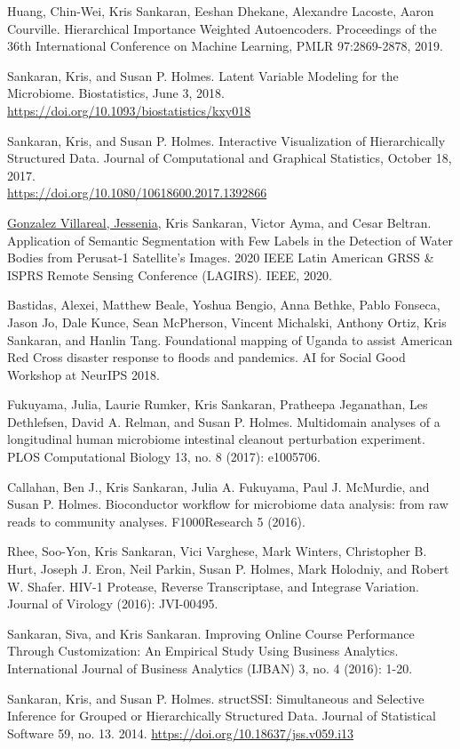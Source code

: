 \documentclass[letterpaper]{article}
\renewenvironment{itemize}{
  \begin{list}{}{
    \setlength{\leftmargin}{1.5em}
  }
}{
  \end{list}
}
\begin{document}
\begin{itemize}
\item Huang, Chin-Wei, Kris Sankaran, Eeshan Dhekane, Alexandre Lacoste, Aaron
  Courville. Hierarchical Importance Weighted Autoencoders. Proceedings of the
  36th International Conference on Machine Learning, PMLR 97:2869-2878, 2019.
 \item Sankaran, Kris, and Susan P. Holmes. Latent Variable Modeling for the
   Microbiome. Biostatistics, June 3, 2018.
   \href{https://doi.org/10.1093/biostatistics/kxy018}{https://doi.org/10.1093/biostatistics/kxy018}
 \item Sankaran, Kris, and Susan P. Holmes. Interactive Visualization of
   Hierarchically Structured Data. Journal of Computational and Graphical
   Statistics, October 18, 2017. \\
   \href{https://doi.org/10.1080/10618600.2017.1392866}{https://doi.org/10.1080/10618600.2017.1392866}
  \item \underline{Gonzalez Villareal, Jessenia}, Kris Sankaran, Victor Ayma,
  and Cesar Beltran. Application of Semantic Segmentation with Few Labels in the
  Detection of Water Bodies from Perusat-1 Satellite’s Images. 2020 IEEE Latin
  American GRSS \& ISPRS Remote Sensing Conference (LAGIRS). IEEE, 2020.
  \item Bastidas, Alexei, Matthew Beale, Yoshua Bengio, Anna Bethke, Pablo
    Fonseca, Jason Jo, Dale Kunce, Sean McPherson, Vincent Michalski, Anthony
    Ortiz, Kris Sankaran, and Hanlin Tang. Foundational mapping of Uganda to
    assist American Red Cross disaster response to floods and pandemics. AI for
    Social Good Workshop at NeurIPS 2018.
  \item Fukuyama, Julia, Laurie Rumker, Kris Sankaran, Pratheepa Jeganathan, Les
    Dethlefsen, David A. Relman, and Susan P. Holmes. Multidomain analyses of a
    longitudinal human microbiome intestinal cleanout perturbation experiment.
    PLOS Computational Biology 13, no. 8 (2017): e1005706.
  \item Callahan, Ben J., Kris Sankaran, Julia A. Fukuyama, Paul J. McMurdie, and
    Susan P. Holmes. Bioconductor workflow for microbiome data analysis: from
    raw reads to community analyses. F1000Research 5 (2016).
  \item Rhee, Soo-Yon, Kris Sankaran, Vici Varghese, Mark Winters, Christopher B.
    Hurt, Joseph J. Eron, Neil Parkin, Susan P. Holmes, Mark Holodniy, and Robert
    W. Shafer. HIV-1 Protease, Reverse Transcriptase, and Integrase Variation.
    Journal of Virology (2016): JVI-00495.
  \item Sankaran, Siva, and Kris Sankaran. Improving Online Course Performance
    Through Customization: An Empirical Study Using Business Analytics.
    International Journal of Business Analytics (IJBAN) 3, no. 4 (2016): 1-20.
\item Sankaran, Kris, and Susan P. Holmes. structSSI: Simultaneous and Selective
  Inference for Grouped or Hierarchically Structured Data. Journal of
  Statistical Software 59, no. 13. 2014. \href{https://doi.org/10.18637/jss.v059.i13}{https://doi.org/10.18637/jss.v059.i13}
\end{itemize}
\end{document}

